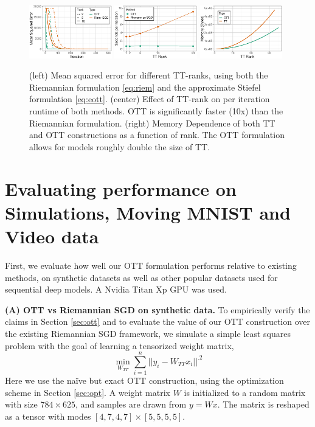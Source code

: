 \begin{figure}
	\centering
	\includegraphics[width=0.32\textwidth]{4_ott/figs/sim/rank_convergence.eps}
	\includegraphics[width=0.32\textwidth]{4_ott/figs/sim/time_comparison.eps}
    \includegraphics[width=0.32\textwidth]{4_ott/figs/sim/mem_vs_rank.eps}
	\caption{\label{fig:riemstief} \footnotesize (left) Mean squared error for different TT-ranks,
          using both the Riemannian formulation \eqref{eq:riem} and the approximate Stiefel formulation \eqref{eq:eott}.
          (center) Effect of TT-rank on per iteration runtime of both methods. OTT is significantly faster (10x)
          than the Riemannian formulation.
          (right) Memory Dependence of both TT and OTT constructions as a function of rank.
          The OTT formulation allows for models roughly double the size of TT.}
\end{figure}

\section{Evaluating performance on Simulations, Moving MNIST and Video data}\label{sec:exps}
First,
we evaluate how well our OTT formulation performs relative to existing methods, on synthetic
datasets as well as other popular datasets used for sequential deep models. 
A Nvidia Titan Xp GPU was used. 

\textbf{(A) OTT vs Riemannian SGD on synthetic data.}
To empirically verify the claims in Section \ref{sec:ott}
and to evaluate the value of our OTT construction over the existing Riemannian SGD framework,
we simulate a simple least squares problem with the goal of learning a tensorized weight matrix,
$$\min_{W_{TT}} \sum_{i=1}^n ||y_i - W_{TT}x_i||^.2$$
Here we use the na\"ive but exact OTT construction,
using the optimization scheme in Section \ref{sec:opt}.
A weight matrix $W$ is initialized to a random matrix with size $784 \times 625$, and samples are drawn from $y=Wx$. The matrix is reshaped as a tensor with modes $[4,7,4,7] \times [5,5,5,5]$.

